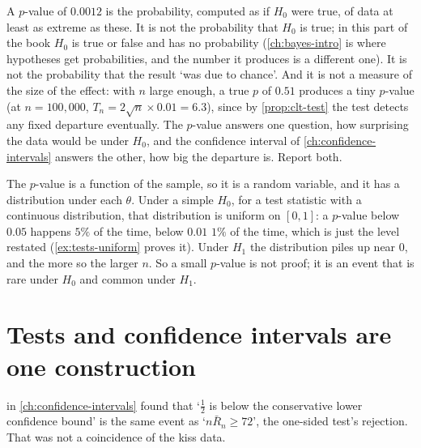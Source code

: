 \begin{pitfall}
A $p$-value of $0.0012$ is the probability, computed as if $H_0$ were true, of data at least as extreme as these.
It is not the probability that $H_0$ is true; in this part of the book $H_0$ is true or false and has no probability (\cref{ch:bayes-intro} is where hypotheses get probabilities, and the number it produces is a different one).
It is not the probability that the result `was due to chance'.
And it is not a measure of the size of the effect: with $n$ large enough, a true $p$ of $0.51$ produces a tiny $p$-value (at $n = 100{,}000$, $T_n = 2\sqrt{n} \times 0.01 = 6.3$), since by \cref{prop:clt-test} the test detects any fixed departure eventually.
The $p$-value answers one question, how surprising the data would be under $H_0$, and the confidence interval of \cref{ch:confidence-intervals} answers the other, how big the departure is.
Report both.
\end{pitfall}

\begin{intuition}
The $p$-value is a function of the sample, so it is a random variable, and it has a distribution under each $\theta$.
Under a simple $H_0$, for a test statistic with a continuous distribution, that distribution is uniform on $[0, 1]$: a $p$-value below $0.05$ happens $5\%$ of the time, below $0.01$ $1\%$ of the time, which is just the level restated (\cref{ex:tests-uniform} proves it).
Under $H_1$ the distribution piles up near $0$, and the more so the larger $n$.
So a small $p$-value is not proof; it is an event that is rare under $H_0$ and common under $H_1$.
\end{intuition}

\section{Tests and confidence intervals are one construction}
\label{sec:tests-duality}

 in \cref{ch:confidence-intervals} found that `$\frac12$ is below the conservative lower confidence bound' is the same event as `$n\bar{R}_n \geq 72$', the one-sided test's rejection.
That was not a coincidence of the kiss data.

